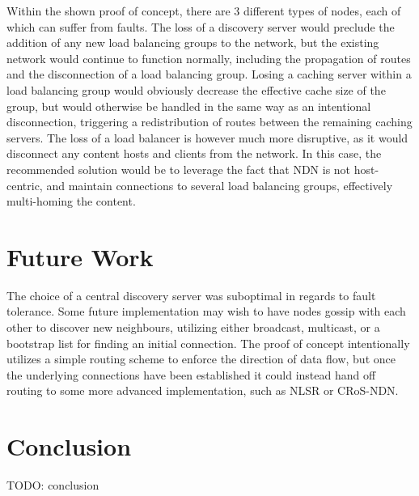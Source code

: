 \documentclass[conference]{IEEEtran}
\begin{document}
    Within the shown proof of concept, there are 3 different types of nodes,
    each of which can suffer from faults.
    The loss of a discovery server would preclude the addition of any new
    load balancing groups to the network,
    but the existing network would continue to function normally,
    including the propagation of routes and the disconnection of a load balancing group.
    Losing a caching server within a load balancing group would obviously decrease
    the effective cache size of the group,
    but would otherwise be handled in the same way as an intentional disconnection,
    triggering a redistribution of routes between the remaining caching servers.
    The loss of a load balancer is however much more disruptive,
    as it would disconnect any content hosts and clients from the network.
    In this case, the recommended solution would be
    to leverage the fact that NDN is not host-centric,
    and maintain connections to several load balancing groups,
    effectively multi-homing the content.




\section*{Future Work}
The choice of a central discovery server was suboptimal in regards to fault tolerance.
Some future implementation may wish to have nodes gossip with each other
to discover new neighbours, utilizing either broadcast, multicast,
or a bootstrap list for finding an initial connection.
The proof of concept intentionally utilizes a simple routing scheme
to enforce the direction of data flow,
but once the underlying connections have been established it could
instead hand off routing to some more advanced implementation,
such as NLSR or CRoS-NDN.



\section*{Conclusion}
TODO: conclusion





\end{document}
